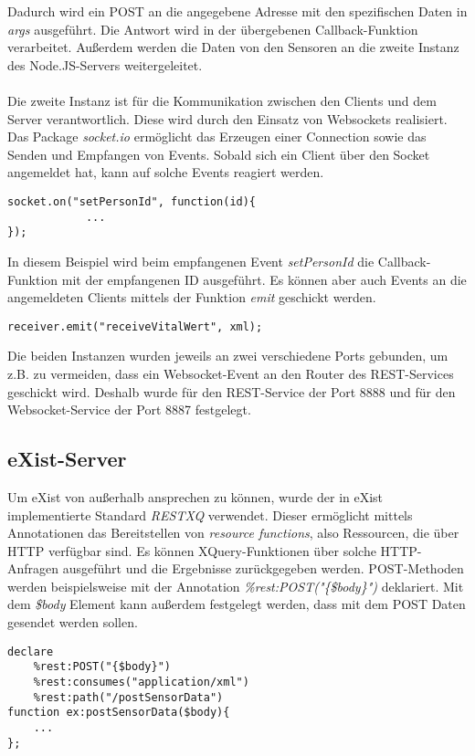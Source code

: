 Dadurch wird ein POST an die angegebene Adresse mit den spezifischen Daten in \textit{args} ausgeführt. Die Antwort wird in der übergebenen Callback-Funktion verarbeitet. Außerdem  werden die Daten von den Sensoren an die zweite Instanz des Node.JS-Servers weitergeleitet.
\\
\\
Die zweite Instanz ist für die Kommunikation zwischen den Clients und dem Server verantwortlich. Diese wird durch den Einsatz von Websockets realisiert. Das Package \textit{socket.io} ermöglicht das Erzeugen einer Connection sowie das Senden und Empfangen von Events. Sobald sich ein Client über den Socket angemeldet hat, kann auf solche Events reagiert werden.

\begin{lstlisting}
socket.on("setPersonId", function(id){
            ...
});
\end{lstlisting}

In diesem Beispiel wird beim empfangenen Event \textit{setPersonId} die Callback-Funktion mit der empfangenen ID ausgeführt. Es können aber auch Events an die angemeldeten Clients mittels der Funktion \textit{emit} geschickt werden.

\begin{lstlisting}
receiver.emit("receiveVitalWert", xml);
\end{lstlisting}

Die beiden Instanzen wurden jeweils an zwei verschiedene Ports gebunden, um z.B. zu vermeiden, dass ein Websocket-Event an den Router des REST-Services geschickt wird. Deshalb wurde für den REST-Service der Port 8888 und für den Websocket-Service der Port 8887 festgelegt.

\subsection{eXist-Server}
Um eXist von außerhalb ansprechen zu können, wurde der in eXist implementierte Standard \textit{RESTXQ} verwendet. Dieser ermöglicht mittels Annotationen das Bereitstellen von \textit{resource functions}, also Ressourcen, die über HTTP verfügbar sind. Es können XQuery-Funktionen über solche HTTP-Anfragen ausgeführt und die Ergebnisse zurückgegeben werden. POST-Methoden werden beispielsweise mit der Annotation \textit{\%rest:POST("\{\$body\}")} deklariert. Mit dem \textit{\$body} Element kann außerdem festgelegt werden, dass mit dem POST Daten gesendet werden sollen.

\begin{lstlisting}
declare
    %rest:POST("{$body}")
    %rest:consumes("application/xml")
    %rest:path("/postSensorData")
function ex:postSensorData($body){
    ...
};
\end{lstlisting}

